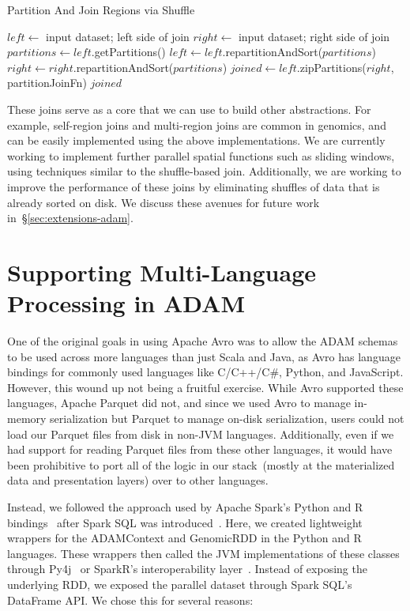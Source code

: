 \documentclass[phd]{ucbthesis}
\begin{document}
\begin{algorithm}
\caption{Partition And Join Regions via Shuffle}
\label{alg:shuffle-region-join}
\begin{algorithmic}
\STATE $left \leftarrow$ input dataset; left side of join
\STATE $right \leftarrow$ input dataset; right side of join
\STATE $partitions \leftarrow left$.getPartitions()
\STATE $left \leftarrow left$.repartitionAndSort($partitions$)
\STATE $right \leftarrow right$.repartitionAndSort($partitions$)
\STATE $joined \leftarrow left$.zipPartitions($right$, {partitionJoinFn})
\RETURN $joined$
\end{algorithmic}
\end{algorithm}

These joins serve as a core that we can use to build other abstractions.
For example, self-region joins and multi-region joins are common in genomics,
and can be easily implemented using the above implementations. We are currently
working to implement further parallel spatial functions such as sliding windows,
using techniques similar to the shuffle-based join. Additionally, we are working
to improve the performance of these joins by eliminating shuffles of data that
is already sorted on disk. We discuss these avenues for future work
in~\S\ref{sec:extensions-adam}.

\section{Supporting Multi-Language Processing in {ADAM}}
\label{sec:multi-language}

One of the original goals in using {Apache Avro} was to allow the
{ADAM} schemas to be used across more languages than just {Scala}
and {Java}, as {Avro} has language bindings for commonly used
languages like C/C++/C\#, {Python}, and {JavaScript}. However,
this wound up not being a fruitful exercise. While {Avro} supported these
languages, {Apache Parquet} did not, and since we used {Avro} to
manage in-memory serialization but {Parquet} to manage on-disk
serialization, users could not load our {Parquet} files from disk in
non-JVM languages. Additionally, even if we had support for reading
{Parquet} files from these other languages, it would have been prohibitive
to port all of the logic in our stack~(mostly at the materialized data and
presentation layers) over to other languages.

Instead, we followed the approach used by {Apache Spark}'s
{Python} and R bindings~\cite{venkataraman16} after {Spark SQL}
was introduced~\cite{armbrust15}. Here, we created lightweight wrappers for
the {ADAMContext} and {GenomicRDD} in the {Python} and
R languages. These wrappers then called the JVM implementations of these classes
through {Py4j}~\cite{py4j} or {SparkR}'s interoperability
layer~\cite{venkataraman16}. Instead of exposing the underlying RDD, we exposed
the parallel dataset through {Spark SQL}'s {DataFrame} API. We
chose this for several reasons:
\end{document}
